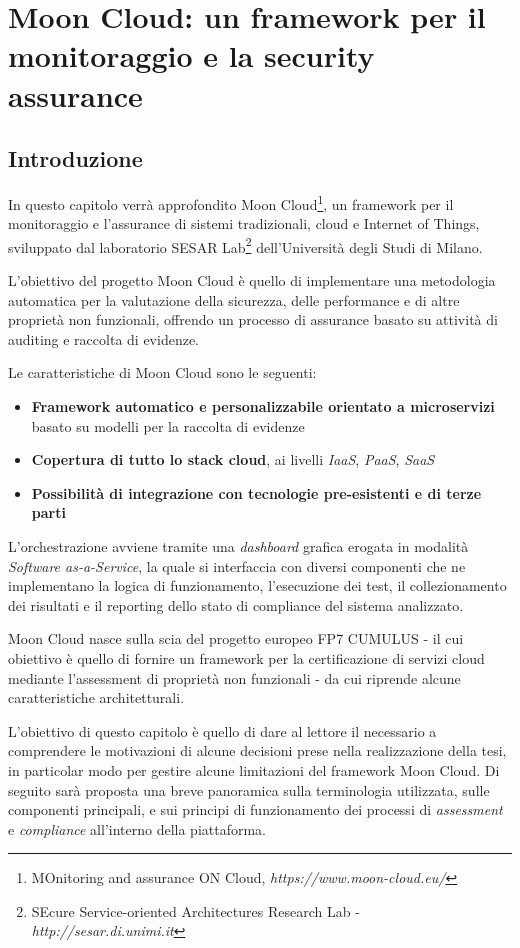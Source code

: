 \documentclass[../main.tex]{subfiles}
\begin{document}
\chapter{Moon Cloud: un framework per il monitoraggio e la security assurance}
\section{Introduzione}
In questo capitolo verrà approfondito Moon Cloud\footnote{MOnitoring and assurance ON Cloud, \textit{https://www.moon-cloud.eu/}}, un framework per il monitoraggio e l'assurance di sistemi tradizionali, cloud e Internet of Things, sviluppato dal laboratorio SESAR Lab\footnote{SEcure Service-oriented Architectures Research Lab - \textit{http://sesar.di.unimi.it}} dell'Università degli Studi di Milano.

L'obiettivo del progetto Moon Cloud è quello di implementare una metodologia automatica per la valutazione della sicurezza, delle performance e di altre proprietà non funzionali, offrendo un processo di assurance basato su attività di auditing e raccolta di evidenze.

Le caratteristiche di Moon Cloud sono le seguenti\cite{MoonCloudWebsite}:
\begin{itemize}
    \item \textbf{Framework automatico e personalizzabile orientato a microservizi} basato su modelli per la raccolta di evidenze
    \item \textbf{Copertura di tutto lo stack cloud}, ai livelli \textit{IaaS}, \textit{PaaS}, \textit{SaaS}
    \item \textbf{Possibilità di integrazione con tecnologie pre-esistenti e di terze parti}
\end{itemize}

L'orchestrazione avviene tramite una  \textit{dashboard} grafica erogata in modalità \textit{Software as-a-Service}, la quale si interfaccia con diversi componenti che ne implementano la logica di funzionamento, l'esecuzione dei test, il collezionamento dei risultati e il reporting dello stato di compliance del sistema analizzato.

Moon Cloud nasce sulla scia del progetto europeo FP7 CUMULUS - il cui obiettivo è quello di fornire un framework per la certificazione di servizi cloud mediante l'assessment di proprietà non funzionali\cite{CumulusBigDoc} - da cui riprende alcune caratteristiche architetturali. 

L'obiettivo di questo capitolo è quello di dare al lettore il  necessario a comprendere le motivazioni di alcune decisioni prese nella realizzazione della tesi, in particolar modo per gestire alcune limitazioni del framework Moon Cloud. 
Di seguito sarà proposta una breve panoramica sulla terminologia utilizzata, sulle componenti principali,  e sui principi di funzionamento dei processi di \textit{assessment} e \textit{compliance} all'interno della piattaforma.
\end{document}
